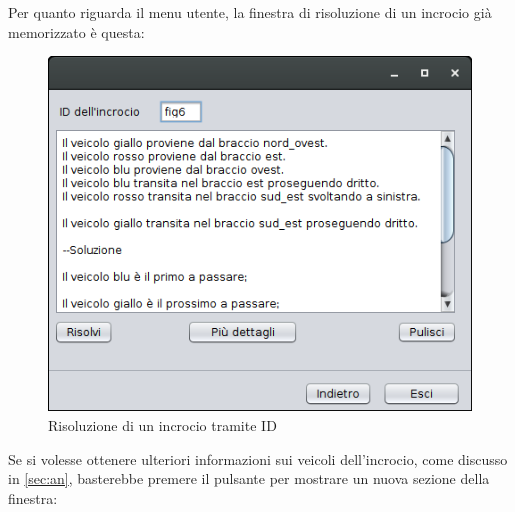 \clearpage
Per quanto riguarda il menu utente, la finestra di risoluzione di un incrocio già memorizzato è questa:
\begin{figure}[!htb]
	\centering
	\includegraphics[width=.6\textwidth]{images/gui/solve_gui1}
	\caption{Risoluzione di un incrocio tramite ID}
\end{figure}



Se si volesse ottenere ulteriori informazioni sui veicoli dell'incrocio, come discusso in \ref{sec:an}, basterebbe premere il pulsante  per mostrare un nuova sezione della finestra:

